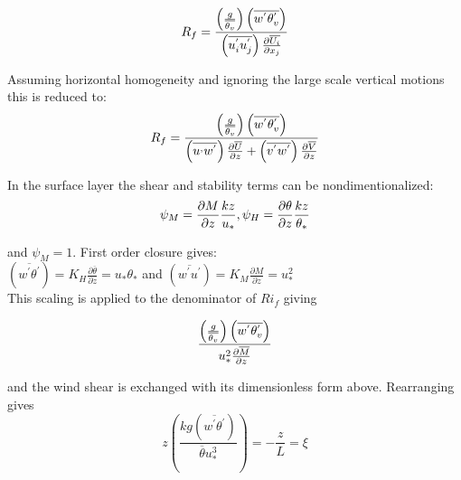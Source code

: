 \begin{equation}
R_{f} = \frac{\left({\frac{g}{\overline{\theta_{v}}}} \right) \left(\overline{w^{'}\theta_{v}^{'}} \right)}{ \left(\overline{u_{i}^{'}u_{j}^{'}} \right) \frac{\partial \overline{U_{i}}}{\partial x_{j}}} \\
\end{equation}

Assuming horizontal homogeneity and ignoring the large scale vertical motions this is reduced to:\\

\begin{equation}
R_{f} = \frac{\left({\frac{g}{\overline{\theta_{v}}}} \right) \left(\overline{w^{'}\theta_{v}^{'}} \right)}{ \left(\overline{u^{,}w^{'}} \right) 
\frac{\partial \overline{U}}{\partial z} + \left(\overline{v^{'}w^{'}} \right) \frac{\partial \overline{V}}{\partial z}} \\
\end{equation}

In the surface layer the shear and stability terms can be nondimentionalized:\\

\begin{equation}
\psi_{M} = \frac{\partial M}{\partial z}\frac{kz}{u_{*}}, \psi_{H} = \frac{\partial \theta}{\partial z}\frac{kz}{\theta_{*}}\\
\end{equation}

and $\psi_{M} = 1$.  First order closure gives:\\

$\left( \overline{w^{'}\theta^{'}} \right) = K_{H} \frac{\partial \overline{\theta}}{\partial z} = u_{*} \theta_{*}$ 
and $\left( \overline{w^{'} u^{'}} \right) = K_{M} \frac{\partial M}{\partial z} = u_{*}^{2}$\\

This scaling is applied to the denominator of $Ri_{f}$ giving

\begin{equation}
\frac{\left({\frac{g}{\overline{\theta_{v}}}} \right) \left(\overline{w^{'}\theta_{v}^{'}} \right)}{u_{*}^{2}  \frac{\partial \overline{M}}{\partial z}}\\
\end{equation}

and the wind shear is exchanged with its dimensionless form above.  Rearranging gives\\

\begin{equation}
z \left( \frac{kg \left( \overline{w^{'} \theta^{'}} \right) }{\overline{\theta} u_{*}^{3}} \right) = -\frac{z}{L} = \xi      
\end{equation}

